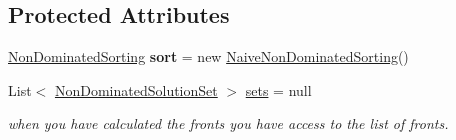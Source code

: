 \subsection*{Protected Attributes}
\begin{DoxyCompactItemize}
\item 
\hypertarget{classcom_1_1msu_1_1moo_1_1util_1_1indicator_1_1NonDominatedRankIndicator_af6ad2ed42de0ccdb8a9c13b54a9ff0a1}{\hyperlink{interfacecom_1_1msu_1_1moo_1_1util_1_1sorting_1_1NonDominatedSorting}{Non\-Dominated\-Sorting} {\bfseries sort} = new \hyperlink{classcom_1_1msu_1_1moo_1_1util_1_1sorting_1_1NaiveNonDominatedSorting}{Naive\-Non\-Dominated\-Sorting}()}\label{classcom_1_1msu_1_1moo_1_1util_1_1indicator_1_1NonDominatedRankIndicator_af6ad2ed42de0ccdb8a9c13b54a9ff0a1}

\item 
\hypertarget{classcom_1_1msu_1_1moo_1_1util_1_1indicator_1_1NonDominatedRankIndicator_abc1e889225e500ab0b5e3478b4521c32}{List$<$ \hyperlink{classcom_1_1msu_1_1moo_1_1model_1_1solution_1_1NonDominatedSolutionSet}{Non\-Dominated\-Solution\-Set} $>$ \hyperlink{classcom_1_1msu_1_1moo_1_1util_1_1indicator_1_1NonDominatedRankIndicator_abc1e889225e500ab0b5e3478b4521c32}{sets} = null}\label{classcom_1_1msu_1_1moo_1_1util_1_1indicator_1_1NonDominatedRankIndicator_abc1e889225e500ab0b5e3478b4521c32}

\begin{DoxyCompactList}\small\item\em when you have calculated the fronts you have access to the list of fronts. \end{DoxyCompactList}\end{DoxyCompactItemize}


